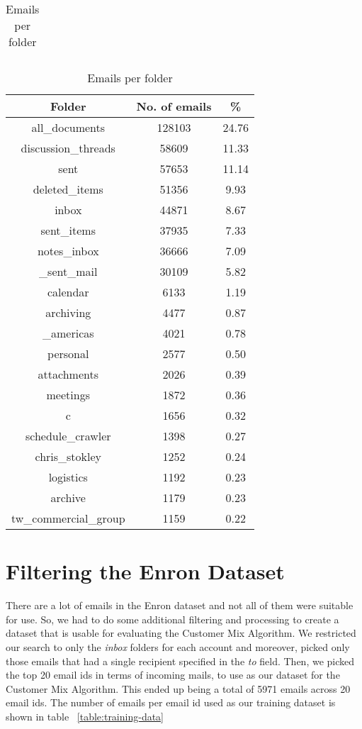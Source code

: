 \documentclass[senior,oneside]{UIUC}
\begin{document}
\begin{table}
{\begin{tabular}{c c c }
\\\end{tabular}
\caption{Emails per directory}
\label{table:person}
}
\parbox{.45\linewidth}{
\begin{tabular}{c c c }
\hline \hline
Folder & No. of emails & \% \\ [0.5ex]
\hline
all\_documents & 128103 & 24.76 \\
discussion\_threads & 58609 & 11.33 \\
sent & 57653 & 11.14 \\
deleted\_items & 51356 & 9.93 \\
inbox & 44871 & 8.67 \\
sent\_items & 37935 & 7.33 \\
notes\_inbox & 36666 & 7.09 \\
\_sent\_mail & 30109 & 5.82 \\
calendar & 6133 & 1.19 \\
archiving & 4477 & 0.87 \\
\_americas & 4021 & 0.78 \\
personal & 2577 & 0.50 \\
attachments & 2026 & 0.39 \\
meetings & 1872 & 0.36 \\
c & 1656 & 0.32 \\
schedule\_crawler & 1398 & 0.27 \\
chris\_stokley & 1252 & 0.24 \\
logistics & 1192 & 0.23 \\
archive & 1179 & 0.23 \\
tw\_commercial\_group & 1159 & 0.22 

\end{tabular}
\caption{Emails per folder}
\label{table:folder}
}
\end{table}

\section{Filtering the Enron Dataset}

There are a lot of emails in the Enron dataset and not all of them were suitable for use. So, we had to do some additional filtering and processing to create a dataset that is usable for evaluating the Customer Mix Algorithm.  We restricted our search to only the \emph{inbox} folders for each account and moreover, picked only those emails that had a single recipient specified in the \emph{to} field. Then, we picked the top 20 email ids in terms of incoming mails, to use as our dataset for the Customer Mix Algorithm. This ended up being a total of 5971 emails across 20 email ids. The number of emails per email id used as our training dataset is shown in table ~\ref{table:training-data}
\end{document}
